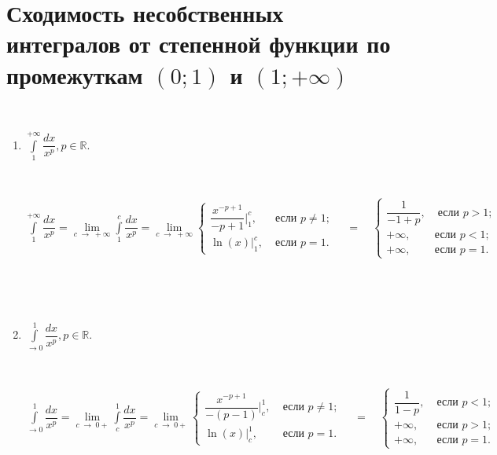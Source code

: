 \documentclass[../main.tex]{subfiles}
\begin{document}
\newpage
\section{Сходимость несобственных интегралов от степенной функции по промежуткам \((0; 1)\) и \( (1; + \infty )\)}
    
\hypertarget{ex:converge}{~}
\begin{enumerate}
    \item \( \displaystyle\int\limits_{ 1}^{ +\infty} \dfrac{ dx}{ x^p}, p \in \mathbb{R}.\)
    
    ~

    \( \displaystyle\int\limits_{ 1}^{ +\infty} \dfrac{ dx}{ x^p} = \lim\limits_{ c \; \rightarrow \; +\infty} \displaystyle\int\limits_{ 1}^{ c} \dfrac{ dx}{ x^p} = \lim\limits_{ c \; \rightarrow \; +\infty} 
    \displaystyle\begin{cases}
        \dfrac{x^{-p + 1} }{ -p + 1} \bigg|_1^c, & \; \text{если } p \neq 1; \\
        \ln(x) \bigg|_1^c, & \; \text{если } p = 1.
    \end{cases}
    \quad =\quad 
    \begin{cases}
    \dfrac{ 1}{ -1 + p}, & \; \text{если } p > 1; \\
    +\infty, & \text{если } p < 1; \\
    +\infty, & \text{если } p = 1. 
    \end{cases}
    \)

    ~
    
    
    ~

    \item \( \displaystyle\int\limits_{ \rightarrow 0}^{ 1} \dfrac{ dx}{ x^p}, p \in \mathbb{R}. \)
    
    ~

    \( \displaystyle\int\limits_{ \rightarrow 0}^{ 1} \dfrac{ dx}{ x^p} = \lim\limits_{ c \; \rightarrow \; 0+} \displaystyle\int\limits_{ c}^{ 1} \dfrac{ dx}{ x^p} = \lim\limits_{ c \; \rightarrow \; 0+} 
    \begin{cases}
        \dfrac{ x^{-p + 1}}{ -(p - 1)} \bigg|_c^1, & \; \text{если } p \neq 1; \\
        \ln(x) \bigg|_c^1, & \; \text{если } p = 1.
    \end{cases}
    \quad =\quad
    \begin{cases}
        \dfrac{ 1}{ 1 - p}, & \; \text{если } p < 1; \\
        +\infty, & \; \text{если } p > 1; \\
        +\infty, & \; \text{если } p = 1.
    \end{cases}
    \)

    ~

\end{enumerate}
\end{document}
